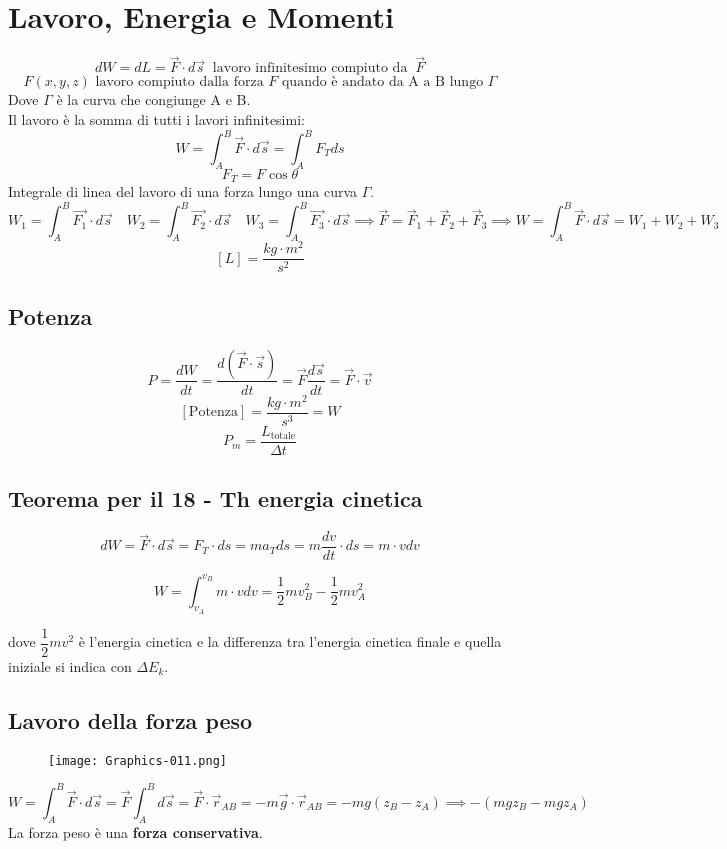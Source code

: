 \documentclass[../../main.tex]{subfiles}
\begin{document}
\section{Lavoro, Energia e Momenti}
\[
    dW = dL = \vec{F} \cdot d\vec{s} \ \text{ lavoro infinitesimo compiuto da } \ \vec{F}
\]
\[
    F(x,y,z) \text{ lavoro compiuto dalla forza $F$ quando è andato da A a B lungo } \Gamma
\]
Dove $\Gamma$ è la curva che congiunge A e B.\\
Il lavoro è la somma di tutti i lavori infinitesimi:
\[
    W = \int_{A}^{B} \vec{F} \cdot d\vec{s} = \int_{A}^{B} F_T ds
\]
\[
    F_T = F \cos \theta
\]
Integrale di linea del lavoro di una forza lungo una curva $\Gamma$.
\[
    W_1 = \int_A^B \vec{F_1} \cdot d\vec{s} \quad W_2 = \int_A^B \vec{F_2} \cdot d\vec{s} \quad W_3 = \int_A^B \vec{F_3} \cdot d\vec{s} \implies \vec F = \vec F_1 + \vec F_2 + \vec F_3 \implies W = \int_{A}^{B} \vec{F} \cdot d\vec{s} = W_1 + W_2 + W_3
\]
\[
    [L] = \dfrac{kg\cdot m^2}{s^2}
\]
\subsection{Potenza}
\[
    P = \frac{dW}{dt} = \dfrac{d(\vec F \cdot \vec s)}{dt} = \vec F \dfrac{d\vec s}{dt} = \vec F \cdot \vec v
\]
\[
    [\text{Potenza}] = \dfrac{kg\cdot m^2}{s^3} = W
\]
\[
    P_m = \dfrac{L_{\text{totale}}}{\Delta t}
\]
\subsection{Teorema per il 18 - Th energia cinetica}
\[
    dW = \vec F\cdot d\vec s = F_T\cdot ds = ma_T ds = m\dfrac{dv}{dt}\cdot ds = m\cdot vdv
\]
\begin{mdframed}[outerlinecolor=red,outerlinewidth=1pt,linecolor=cccolor,roundcorner=10pt]
    \[
        W = \int_{v_A}^{v_B} m\cdot vdv = \dfrac{1}{2}mv_B^2 - \dfrac{1}{2}mv_A^2
    \]
\end{mdframed}
dove $\dfrac{1}{2} mv^2$ è l'energia cinetica e la differenza tra l'energia cinetica finale e quella iniziale si indica con $\Delta E_k$.

\subsection{Lavoro della forza peso}
\begin{figure}[H]
    \centering
    \texttt{[image: Graphics-011.png]}
\end{figure}
\[
    W = \int_{A}^{B} \vec F\cdot d\vec s = \vec F \int_{A}^{B} d\vec s = \vec F \cdot \vec r_{AB} = -m\vec g \cdot \vec r_{AB} = -mg(z_B - z_A) \implies -(mgz_B - mgz_A)
\]
La forza peso è una \textbf{forza conservativa}.
\end{document}
